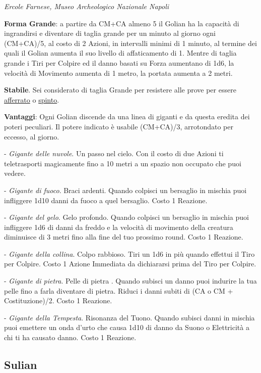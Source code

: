\begin{multicols}{2}
\begin{center}
	\medskip

	\emph{Ercole Farnese, Museo Archeologico Nazionale Napoli}

\end{center}

\textbf{Forma Grande}: a partire da CM+CA almeno 5 il Golian ha la capacità di ingrandirsi e diventare di taglia grande per un minuto al giorno ogni (CM+CA)/5, al costo di 2 Azioni, in intervalli minimi di 1 minuto, al termine dei quali il Golian aumenta il suo livello di affaticamento di 1. Mentre di taglia grande i Tiri per Colpire ed il danno basati su Forza aumentano di 1d6, la velocità di Movimento aumenta di 1 metro, la portata aumenta a 2 metri.

\textbf{Stabile}. Sei considerato di taglia Grande per resistere alle prove per essere \hyperlink{spingereavversario}{afferrato} o \hyperlink{spingereavversario}{spinto}.

\textbf{Vantaggi}: Ogni Golian discende da una linea di giganti e da questa eredita dei poteri peculiari. Il potere indicato è usabile (CM+CA)/3, arrotondato per eccesso, al giorno.

- \emph{Gigante delle nuvole}. Un passo nel cielo. Con il costo di due Azioni ti teletrasporti magicamente fino a 10 metri a un spazio non occupato che puoi vedere.

- \emph{Gigante di fuoco}. Braci ardenti. Quando colpisci un bersaglio in mischia puoi infliggere 1d10 danni da fuoco a quel bersaglio. Costo 1 Reazione.

- \emph{Gigante del gelo}. Gelo profondo. Quando colpisci un bersaglio in mischia puoi infliggere 1d6 di danni da freddo e la velocità di movimento della creatura diminuisce di 3 metri fino alla fine del tuo prossimo round. Costo 1 Reazione.

- \emph{Gigante della collina}. Colpo rabbioso. Tiri un 1d6 in più quando effettui il Tiro per Colpire. Costo 1 Azione Immediata da dichiararsi prima del Tiro per Colpire.

- \emph{Gigante di pietra}. Pelle di pietra . Quando subisci un danno puoi indurire la tua pelle fino a farla diventare di pietra. Riduci i danni subiti di (CA o CM + Costituzione)/2. Costo 1 Reazione.

- \emph{Gigante della Tempesta}. Risonanza del Tuono. Quando subisci danni in mischia puoi emettere un onda d'urto che causa 1d10 di danno da Suono o Elettricità a chi ti ha causato danno. Costo 1 Reazione.

\subsection{Sulian}\label{sulian}\hypertarget{sulian}{}


\end{multicols}
